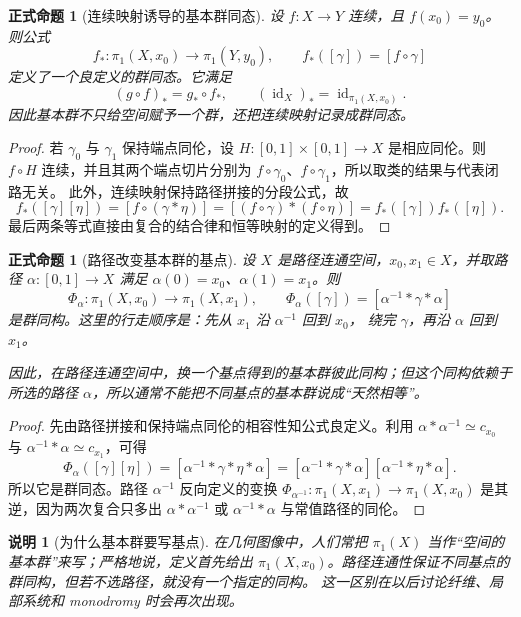 \documentclass[UTF8,fontset=none,a4paper,11pt]{ctexart}
\theoremstyle{foundation-definition}
\theoremstyle{foundation-theorem}
\theoremstyle{foundation-proposition}
\newtheorem{proposition}[definition]{正式命题}
\theoremstyle{foundation-example}
\theoremstyle{foundation-remark}
\newtheorem{remark}[definition]{说明}
\theoremstyle{foundation-theorem}
\begin{document}
\begin{proposition}[连续映射诱导的基本群同态]\label{prop:pi1-induced-map}
设 \(f:X\to Y\) 连续，且 \(f(x_0)=y_0\)。则公式
\[
f_*:\pi_1(X,x_0)\longrightarrow\pi_1(Y,y_0),
\qquad f_*([\gamma])=[f\circ\gamma]
\]
定义了一个良定义的群同态。它满足
\[
(g\circ f)_*=g_*\circ f_*,
\qquad (\operatorname{id}_X)_*=\operatorname{id}_{\pi_1(X,x_0)}.
\]
因此基本群不只给空间赋予一个群，还把连续映射记录成群同态。
\end{proposition}

\begin{proof}
若 \(\gamma_0\) 与 \(\gamma_1\) 保持端点同伦，设
\(H:[0,1]\times[0,1]\to X\) 是相应同伦。则
\(f\circ H\) 连续，并且其两个端点切片分别为
\(f\circ\gamma_0\)、\(f\circ\gamma_1\)，所以取类的结果与代表闭路无关。
此外，连续映射保持路径拼接的分段公式，故
\[
f_*([\gamma][\eta])=[f\circ(\gamma*\eta)]
=[(f\circ\gamma)*(f\circ\eta)]
=f_*([\gamma])f_*([\eta]).
\]
最后两条等式直接由复合的结合律和恒等映射的定义得到。
\end{proof}

\begin{proposition}[路径改变基本群的基点]\label{prop:pi1-basepoint-change}
设 \(X\) 是路径连通空间，\(x_0,x_1\in X\)，并取路径
\(\alpha:[0,1]\to X\) 满足 \(\alpha(0)=x_0\)、\(\alpha(1)=x_1\)。则
\[
\Phi_\alpha:\pi_1(X,x_0)\longrightarrow\pi_1(X,x_1),
\qquad
\Phi_\alpha([\gamma])=[\alpha^{-1}*\gamma*\alpha]
\]
是群同构。这里的行走顺序是：先从 \(x_1\) 沿 \(\alpha^{-1}\) 回到 \(x_0\)，
绕完 \(\gamma\)，再沿 \(\alpha\) 回到 \(x_1\)。

因此，在路径连通空间中，换一个基点得到的基本群彼此同构；但这个同构依赖于所选的路径
\(\alpha\)，所以通常不能把不同基点的基本群说成“天然相等”。
\end{proposition}

\begin{proof}
先由路径拼接和保持端点同伦的相容性知公式良定义。利用
\(\alpha*\alpha^{-1}\simeq c_{x_0}\) 与
\(\alpha^{-1}*\alpha\simeq c_{x_1}\)，可得
\[
\Phi_\alpha([\gamma][\eta])
=[\alpha^{-1}*\gamma*\eta*\alpha]
=[\alpha^{-1}*\gamma*\alpha]
 [\alpha^{-1}*\eta*\alpha].
\]
所以它是群同态。路径 \(\alpha^{-1}\) 反向定义的变换
\(\Phi_{\alpha^{-1}}:\pi_1(X,x_1)\to\pi_1(X,x_0)\) 是其逆，因为两次复合只多出
\(\alpha*\alpha^{-1}\) 或 \(\alpha^{-1}*\alpha\) 与常值路径的同伦。
\end{proof}

\begin{remark}[为什么基本群要写基点]
在几何图像中，人们常把 \(\pi_1(X)\) 当作“空间的基本群”来写；严格地说，定义首先给出
\(\pi_1(X,x_0)\)。路径连通性保证不同基点的群同构，但若不选路径，就没有一个指定的同构。
这一区别在以后讨论纤维、局部系统和 monodromy 时会再次出现。
\end{remark}
\end{document}
